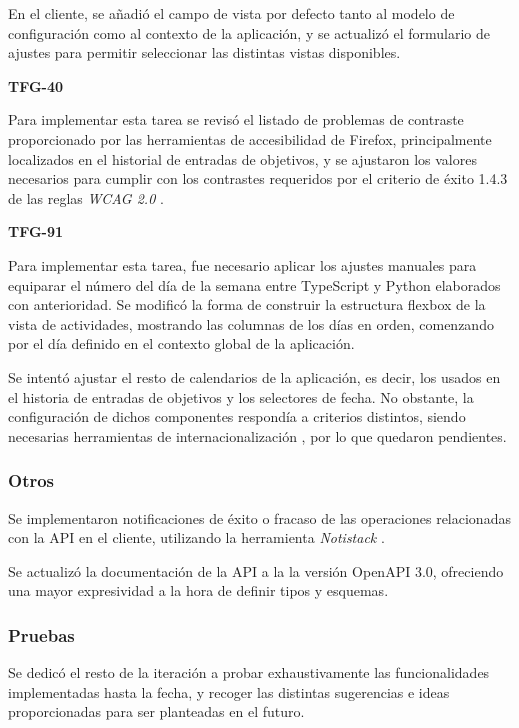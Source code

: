 \documentclass[10pt, a4paper]{aqademic}
\begin{document}
En el cliente, se añadió el campo de vista por defecto tanto al modelo de configuración como al contexto de la aplicación, y se actualizó el formulario de ajustes para permitir seleccionar las distintas vistas disponibles.

\medskip

\textbf{TFG-40}

Para implementar esta tarea se revisó el listado de problemas de contraste proporcionado por las herramientas de accesibilidad de Firefox, principalmente localizados en el historial de entradas de objetivos, y se ajustaron los valores necesarios para cumplir con los contrastes requeridos por el criterio de éxito 1.4.3 de las reglas \textit{WCAG 2.0} \cite{noauthor_understanding_nodate}.

\medskip

\textbf{TFG-91}

Para implementar esta tarea, fue necesario aplicar los ajustes manuales para equiparar el número del día de la semana entre TypeScript y Python elaborados con anterioridad. Se modificó la forma de construir la estructura flexbox de la vista de actividades, mostrando las columnas de los días en orden, comenzando por el día definido en el contexto global de la aplicación.

Se intentó ajustar el resto de calendarios de la aplicación, es decir, los usados en el historia de entradas de objetivos y los selectores de fecha. No obstante, la configuración de dichos componentes respondía a criterios distintos, siendo necesarias herramientas de internacionalización \cite{noauthor_diferencias_nodate}, por lo que quedaron pendientes.


\subsubsection{Otros}

Se implementaron notificaciones de éxito o fracaso de las operaciones relacionadas con la API en el cliente, utilizando la herramienta \textit{Notistack} \cite{dehnokhalaji_notistack_nodate}.

Se actualizó la documentación de la API a la la versión OpenAPI 3.0, ofreciendo una mayor expresividad a la hora de definir tipos y esquemas.


\subsubsection{Pruebas}

Se dedicó el resto de la iteración a probar exhaustivamente las funcionalidades implementadas hasta la fecha, y recoger las distintas sugerencias e ideas proporcionadas para ser planteadas en el futuro.
\end{document}
